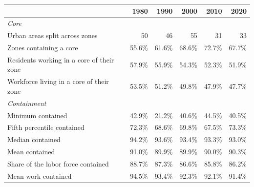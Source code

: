 \begin{tabular}{lrrrrr}
\hline\hline
& 1980 & 1990 & 2000 & 2010 & 2020 \\
\hline
\multicolumn{6}{l}{\emph{Core}} \\
\quad Urban areas split across zones & 50 & 46 & 55 & 31 & 33 \\
\quad Zones containing a core & 55.6\% & 61.6\% & 68.6\% & 72.7\% & 67.7\% \\
\quad Residents working in a core of their zone & 57.9\% & 55.9\% & 54.3\% & 52.3\% & 51.9\% \\
\quad Workforce living in a core of their zone & 53.5\% & 51.2\% & 49.8\% & 47.9\% & 47.7\% \\[3pt]
\multicolumn{6}{l}{\emph{Containment}} \\
\quad Minimum contained & 42.9\% & 21.2\% & 40.6\% & 44.5\% & 40.5\% \\
\quad Fifth percentile contained & 72.3\% & 68.6\% & 69.8\% & 67.5\% & 73.3\% \\
\quad Median contained & 94.2\% & 93.6\% & 93.4\% & 93.3\% & 93.0\% \\
\quad Mean contained & 91.0\% & 89.9\% & 89.9\% & 90.0\% & 90.3\% \\
\quad Share of the labor force contained & 88.7\% & 87.3\% & 86.6\% & 85.8\% & 86.2\% \\
\quad Mean work contained & 94.5\% & 93.4\% & 92.3\% & 92.1\% & 91.4\% \\
\hline\hline
\end{tabular}
